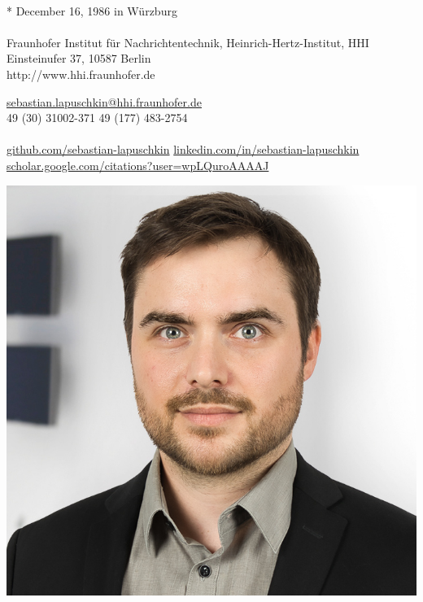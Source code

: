 \documentclass[10pt,a4paper]{article} %
\begin{document}

\noindent
\begin{minipage}{.8\textwidth}

\\ %
* December 16, 1986 in Würzburg  %
\\
\phantom{Contact:} \\ %
Fraunhofer Institut für Nachrichtentechnik, Heinrich-Hertz-Institut, HHI\\
Einsteinufer 37, 10587 Berlin\\
http://www.hhi.fraunhofer.de

\noindent\href{mailto:sebastian.lapuschkin@hhi.fraunhofer.de}{sebastian.lapuschkin@hhi.fraunhofer.de}\\ %
\textsmaller{+}49 (30) 31002-371\bull
\textsmaller{+}49 (177) 483-2754\\ %
\\
\href{https://github.com/sebastian-lapuschkin}{github.com/sebastian-lapuschkin}\bull %
\href{https://www.linkedin.com/in/sebastian-lapuschkin}{linkedin.com/in/sebastian-lapuschkin}%
\\
\href{https://scholar.google.com/citations?user=wpLQuroAAAAJ}{scholar.google.com/citations?user=wpLQuroAAAAJ} %
\end{minipage}
\begin{minipage}{.2\textwidth}
\includegraphics[width=\textwidth]{resources/mug-2021.jpg}
\end{minipage}
\end{document}
